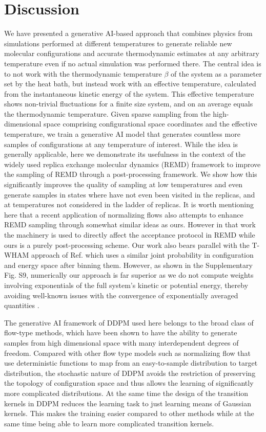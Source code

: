 \documentclass[9pt,twocolumn,twoside]{pnas-new}
\newcommand{\onlinecite}[1]{\hspace{-1 ex} \nocite{#1}\citenum{#1}}
\begin{document}
\section*{Discussion}
We have presented a generative AI-based approach that combines physics from simulations performed at different temperatures to generate reliable new molecular configurations and accurate thermodynamic estimates at any arbitrary temperature even if no actual simulation was performed there. The central idea is to not work with the thermodynamic temperature $\beta$ of the system as a parameter set by the heat bath, but instead work with an effective temperature, calculated from the instantaneous kinetic energy of the system. This effective temperature shows non-trivial fluctuations for a finite size system, and on an average equals the thermodynamic temperature. Given sparse sampling from the high-dimensional space comprising configurational space coordinates and the effective temperature, we train a generative AI model that generates countless more samples of configurations at any temperature of interest.  While the idea is generally applicable, here we demonstrate its usefulness in the context of the widely used replica exchange molecular dynamics (REMD) framework to improve the sampling of REMD through a post-processing framework. We show how this significantly improves the quality of sampling at low temperatures and even generate samples in states where have not even been visited in the replicas, and at temperatures not considered in the ladder of replicas.  It is worth mentioning here that a recent application\cite{dibak2020temperature} of normalizing flows also attempts to enhance REMD sampling through somewhat similar ideas as ours. However in that work the machinery is used to directly affect the acceptance protocol in REMD while ours is a purely post-processing scheme.  Our work also bears parallel with the T-WHAM approach of Ref. \onlinecite{gallicchio2005temperature} which uses a similar joint probability in configuration and energy space after binning them. However, as shown in the Supplementary Fig. S9, numerically our approach is far superior as we do not compute weights involving exponentials of the full system's kinetic or potential energy, thereby avoiding well-known issues with the convergence of exponentially averaged quantities \cite{jarzynski2006rare}.

The generative AI framework of DDPM used here belongs to the broad class of flow-type methods, which have been shown to have the ability to generate samples from high dimensional space with many interdependent degrees of freedom. Compared with other flow type models such as normalizing flow\cite{NF, Boltzmann_generators}  that use deterministic functions to map from an easy-to-sample distribution to target distribution, the stochastic nature of DDPM avoids the restriction of preserving the topology of configuration space and thus allows the learning of significantly more complicated distributions. At the same time the design of the transition kernels in DDPM reduces the learning task to just learning means of Gaussian kernels. This makes the training easier compared to other methods\cite{stochastic_NF} while at the same time being able to learn more complicated transition kernels. 
\end{document}
